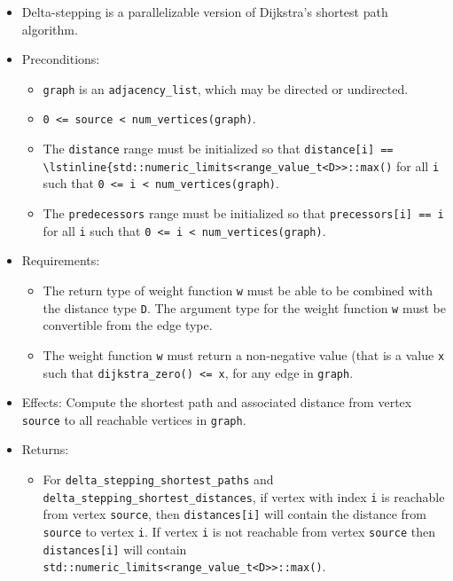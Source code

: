 \begin{itemize}
\item[] Delta-stepping is a parallelizable version of Dijkstra's shortest path algorithm.
\item[] Preconditions:
\begin{itemize}
\item[]
\lstinline{graph} is an \lstinline{adjacency_list}, which may be directed or
undirected.
\item[]
\lstinline{0 <= source < num_vertices(graph)}.
\item[]
  The \lstinline{distance} range must be initialized so that 
    \lstinline{distance[i] == \lstinline{std::numeric_limits<range_value_t<D>>::max()} 
      for all \lstinline{i}
      such that \lstinline{0 <= i < num_vertices(graph)}.  
\item[]
  The \lstinline{predecessors} range must be initialized so that
  \lstinline{precessors[i] == i} for all \lstinline{i} such that 
  \lstinline{0 <= i < num_vertices(graph)}.
\end{itemize}
\item[] Requirements: 
\begin{itemize}
\item[]
The return type of weight function \lstinline{w} must be able to
  be combined with the distance type \lstinline{D}.  The argument type for the weight
  function \lstinline{w} must be convertible from the edge type.
\item[]
  The weight function \lstinline{w} must return a non-negative value (that is
  a value \lstinline{x} such that \lstinline{dijkstra_zero() <= x},
  for any edge in \lstinline{graph}.
\end{itemize}
\item[] 
Effects: Compute the shortest path and associated distance from vertex
\lstinline{source} to all reachable vertices in \lstinline{graph}.
\item[] 
Returns:
\begin{itemize}
\item[] For \lstinline{delta_stepping_shortest_paths} and \lstinline{delta_stepping_shortest_distances},
  if vertex with index \lstinline{i} is reachable from vertex \lstinline{source}, then
  \lstinline{distances[i]} will contain the distance from \lstinline{source} to vertex
  \lstinline{i}.  If vertex \lstinline{i} is not reachable from vertex
  \lstinline{source} then \lstinline{distances[i]} will contain
  \lstinline{std::numeric_limits<range_value_t<D>>::max()}.

\end{itemize}
\end{itemize}
